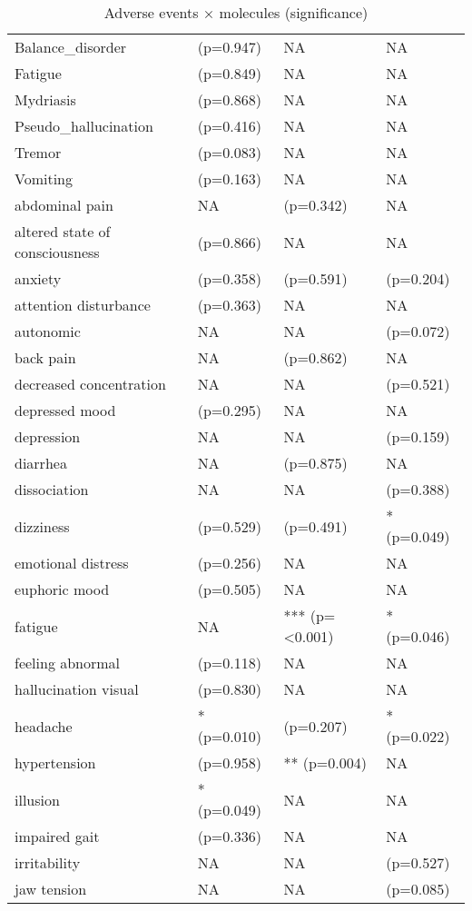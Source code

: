 \begin{table}[!h]
\centering
\caption{Adverse events × molecules (significance)}
\centering
\begin{tabular}[t]{llll}
\toprule
Balance\_disorder & (p=0.947) & NA & NA\\
Fatigue & (p=0.849) & NA & NA\\
Mydriasis & (p=0.868) & NA & NA\\
Pseudo\_hallucination & (p=0.416) & NA & NA\\
Tremor & (p=0.083) & NA & NA\\
\addlinespace
Vomiting & (p=0.163) & NA & NA\\
abdominal pain & NA & (p=0.342) & NA\\
altered state of consciousness & (p=0.866) & NA & NA\\
anxiety & (p=0.358) & (p=0.591) & (p=0.204)\\
attention disturbance & (p=0.363) & NA & NA\\
\addlinespace
autonomic & NA & NA & (p=0.072)\\
back pain & NA & (p=0.862) & NA\\
decreased concentration & NA & NA & (p=0.521)\\
depressed mood & (p=0.295) & NA & NA\\
depression & NA & NA & (p=0.159)\\
\addlinespace
diarrhea & NA & (p=0.875) & NA\\
dissociation & NA & NA & (p=0.388)\\
dizziness & (p=0.529) & (p=0.491) & * (p=0.049)\\
emotional distress & (p=0.256) & NA & NA\\
euphoric mood & (p=0.505) & NA & NA\\
\addlinespace
fatigue & NA & *** (p=<0.001) & * (p=0.046)\\
feeling abnormal & (p=0.118) & NA & NA\\
hallucination visual & (p=0.830) & NA & NA\\
headache & * (p=0.010) & (p=0.207) & * (p=0.022)\\
hypertension & (p=0.958) & ** (p=0.004) & NA\\
\addlinespace
illusion & * (p=0.049) & NA & NA\\
impaired gait & (p=0.336) & NA & NA\\
irritability & NA & NA & (p=0.527)\\
jaw tension & NA & NA & (p=0.085)\\

\end{tabular}
\end{table}

